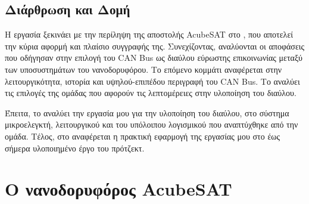\documentclass[a4paper,nobib,justified]{tufte-book}
\begin{document}
\section{Διάρθρωση και Δομή}
Η εργασία ξεκινάει με την περίληψη της αποστολής AcubeSAT στο , που αποτελεί την κύρια αφορμή και πλαίσιο συγγραφής της. Συνεχίζοντας, αναλύονται οι αποφάσεις που οδήγησαν στην επιλογή του CAN Bus ως διαύλου εύρωστης επικοινωνίας μεταξύ των υποσυστημάτων του νανοδορυφόρου. Το επόμενο κομμάτι αναφέρεται στην λειτουργικότητα, ιστορία και υψηλού-επιπέδου περιγραφή του CAN Bus. Το  αναλύει τις επιλογές της ομάδας που αφορούν τις λεπτομέρειες στην υλοποίηση του διαύλου.

\par Έπειτα, το  αναλύει την εργασία μου για την υλοποίηση του διαύλου, στο σύστημα μικροελεγκτή, λειτουργικού και του υπόλοιπου λογισμικού που αναπτύχθηκε από την ομάδα. Τέλος, στο  αναφέρεται η πρακτική εφαρμογή της εργασίας μου στο έως σήμερα υλοποιημένο έργο του πρότζεκτ.

\chapter{Ο νανοδορυφόρος AcubeSAT} \label{acubesat}
\end{document}
